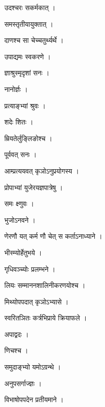 \documentclass[10pt, openany]{book}
\begin{document}
\noindent उदश्चरः सकर्मकात् ।

\noindent समस्तृतीयायुक्तात् ।

\noindent दाणश्च सा चेच्चतुर्थ्यर्थे ।

\noindent उपाद्यमः स्वकरणे ।

\noindent ज्ञाश्रुस्मृदृशां सनः ।

\noindent नानोर्ज्ञः ।

\noindent प्रत्याङ्भ्यां श्रुवः ।

\noindent शदेः शितः ।

\noindent म्रियतेर्लुङ्लिङोश्च ।

\noindent पूर्ववत् सनः ।

\noindent आम्प्रत्ययवत् कृञोऽनुप्रयोगस्य ।

\noindent प्रोपाभ्यां युजेरयज्ञपात्रेषु ।

\noindent समः क्ष्णुवः ।

\noindent भुजोऽनवने ।

\noindent णेरणौ यत् कर्म णौ चेत् स कर्ताऽनाध्याने ।

\noindent भीस्म्योर्हेतुभये ।

\noindent गृधिवञ्च्योः प्रलम्भने ।

\noindent लियः सम्माननशालिनीकरणयोश्च ।

\noindent मिथ्योपपदात् कृञोऽभ्यासे ।

\noindent स्वरितञितः कर्त्रभिप्राये क्रियाफले ।

\noindent अपाद्वदः ।

\noindent णिचश्च ।

\noindent समुदाङ्भ्यो यमोऽग्रन्थे ।

\noindent अनुपसर्गाज्ज्ञः ।

\noindent विभाषोपपदेन प्रतीयमाने ।
\end{document}
